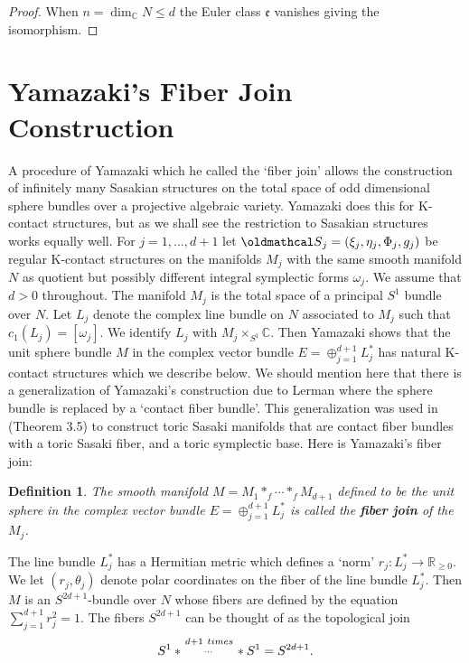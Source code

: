 \documentclass[12pt]{amsart}
\newtheorem{definition}[theorem]{Definition}
\def\fract#1#2{\raise4pt\hbox{$ #1 \atop #2 $}}
\def\bbc{{\mathbb C}}
\def\bbr{{\mathbb R}}
\def\gro{\omega}
\def\cals{{\oldmathcal S}}
\def\ge{{\mathfrak e}}
\begin{document}
\begin{proof}
When $n=\dim_\bbc N\leq d$ the Euler class $\ge$ vanishes giving the isomorphism.
\end{proof}

\section{Yamazaki's Fiber Join Construction}
A procedure of Yamazaki which he called the `fiber join' allows the construction of infinitely many Sasakian structures on the total space of odd dimensional sphere bundles over a projective algebraic variety. Yamazaki \cite{Yam99} does this for K-contact structures, but as we shall see the restriction to Sasakian structures works equally well. For $j=1,\ldots,d+1$ let $\cals_j=(\xi_j,\eta_j,\Phi_j,g_j)$ be regular K-contact structures on the manifolds $M_j$ with the same smooth manifold $N$ as quotient but possibly different integral symplectic forms $\gro_j$. We assume that $d>0$ throughout. The manifold $M_j$ is the total space of a principal $S^1$ bundle over $N$. Let $L_j$ denote the complex line bundle on $N$ associated to $M_j$ such that $c_1(L_j)=[\gro_j]$. We identify $L_j$ with $M_j\times_{S^1}\bbc$. Then Yamazaki shows that the unit sphere bundle $M$ in the complex vector bundle $E=\oplus_{j=1}^{d+1}L^*_{j}$ has natural K-contact structures which we describe below. We should mention here that there is a generalization of Yamazaki's construction due to Lerman \cite{Ler04b} where the sphere bundle is replaced by a `contact fiber bundle'. This generalization was used in \cite{BGO06} (Theorem 3.5) to construct toric Sasaki manifolds that are contact fiber bundles with a toric Sasaki fiber, and a toric symplectic base. Here is Yamazaki's fiber join:

\begin{definition}\label{fiberjoindef}
The smooth manifold $M=M_1*_f\cdots *_fM_{d+1}$ defined to be the unit sphere in the complex vector bundle $E=\oplus_{j=1}^{d+1}L^*_{j}$ is called the {\bf fiber join} of the $M_j$.
\end{definition}

The line bundle $L^*_j$ has a Hermitian metric which defines a `norm' $r_j:L^*_j\rightarrow \bbr_{\geq 0}$. We
let $(r_j,\theta_j)$ denote polar coordinates on the fiber of the line bundle $L^*_j$. Then $M$ is an $S^{2d+1}$-bundle over $N$ whose fibers are defined by the equation $\sum_{j=1}^{d+1}r_j^2=1$. The fibers $S^{2d+1}$ can be thought of as the topological join 
$$S^1*\fract{d+1~times}{\cdots}* S^1=S^{2d+1}.$$
\end{document}
